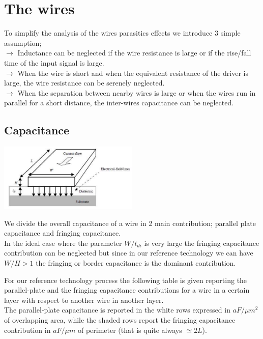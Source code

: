 \chapter{The wires}

To simplify the analysis of the wires parasitics effects we introduce 3 simple assumption;\\
\vspace{2mm}
\tab $\rightarrow$ Inductance can be neglected if the wire resistance is large or if the rise/fall time of the input signal is large.\\
\vspace{2mm}
\tab $\rightarrow$ When the wire is short and when the equivalent resistance of the driver is large, the wire resistance can be serenely neglected.\\
\vspace{2mm}
\tab $\rightarrow$ When the separation between nearby wires is large or when the wires run in parallel for a short distance, the inter-wires capacitance can be neglected.\\


\section{Capacitance}

\centering
\includegraphics[width=0.5\textwidth]{C5_1.png}\\
\raggedright

We divide the overall capacitance of a wire in 2 main contribution; parallel plate capacitance and fringing capacitance.\\
In the ideal case where the parameter $W/t_{di}$ is very large the fringing capacitance contribution can be neglected but since in our reference technology we can have $W/H>1$ the fringing or border capacitance is the dominant contribution.\\
\vspace{5mm}

For our reference technology process the following table is given reporting the parallel-plate and the fringing capacitance contributions for a wire in a certain layer with respect to another wire in another layer.\\
The parallel-plate capacitance is reported in the white rows expressed in $aF/\mu m^2$ of overlapping area, while the shaded rows report the fringing capacitance contribution in $aF/\mu m$ of perimeter (that is quite always $\simeq 2L$).\\

